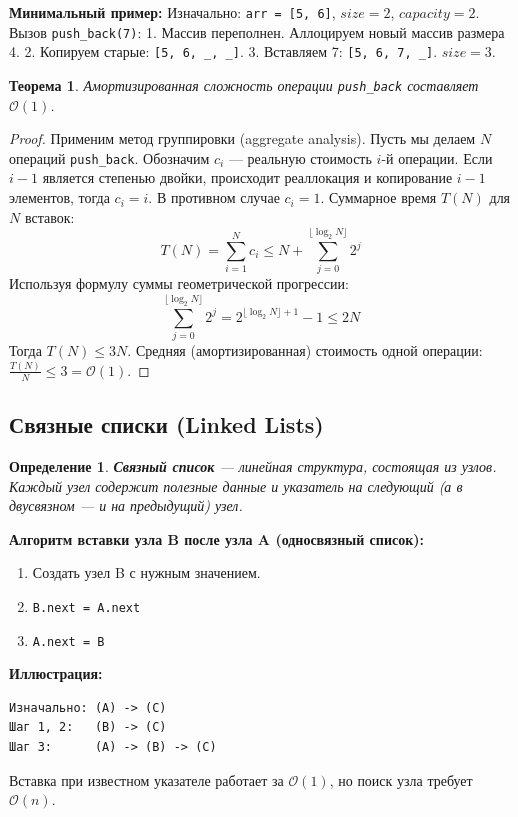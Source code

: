 \documentclass[12pt,a4paper]{article}
\newtheorem{definition}{Определение}
\newtheorem{theorem}{Теорема}
\begin{document}
\textbf{Минимальный пример:}
Изначально: \texttt{arr = [5, 6]}, $size = 2$, $capacity = 2$.
Вызов \texttt{push\_back(7)}:
1. Массив переполнен. Аллоцируем новый массив размера 4.
2. Копируем старые: \texttt{[5, 6, \_, \_]}.
3. Вставляем 7: \texttt{[5, 6, 7, \_]}. $size = 3$.

\begin{theorem}
Амортизированная сложность операции \texttt{push\_back} составляет $\mathcal{O}(1)$.
\end{theorem}
\begin{proof}
Применим метод группировки (aggregate analysis). Пусть мы делаем $N$ операций \texttt{push\_back}. Обозначим $c_i$ — реальную стоимость $i$-й операции.
Если $i-1$ является степенью двойки, происходит реаллокация и копирование $i-1$ элементов, тогда $c_i = i$. В противном случае $c_i = 1$.
Суммарное время $T(N)$ для $N$ вставок:
$$ T(N) = \sum_{i=1}^{N} c_i \le N + \sum_{j=0}^{\lfloor \log_2 N \rfloor} 2^j $$
Используя формулу суммы геометрической прогрессии:
$$ \sum_{j=0}^{\lfloor \log_2 N \rfloor} 2^j = 2^{\lfloor \log_2 N \rfloor + 1} - 1 \le 2N $$
Тогда $T(N) \le 3N$. Средняя (амортизированная) стоимость одной операции: $\frac{T(N)}{N} \le 3 = \mathcal{O}(1)$.
\end{proof}

\subsection{Связные списки (Linked Lists)}
\begin{definition}
\textbf{Связный список} — линейная структура, состоящая из узлов. Каждый узел содержит полезные данные и указатель на следующий (а в двусвязном — и на предыдущий) узел.
\end{definition}

\textbf{Алгоритм вставки узла B после узла A (односвязный список):}
\begin{enumerate}
    \item Создать узел B с нужным значением.
    \item \texttt{B.next = A.next}
    \item \texttt{A.next = B}
\end{enumerate}

\textbf{Иллюстрация:}
\begin{verbatim}
Изначально: (A) -> (C)
Шаг 1, 2:   (B) -> (C)
Шаг 3:      (A) -> (B) -> (C)
\end{verbatim}
Вставка при известном указателе работает за $\mathcal{O}(1)$, но поиск узла требует $\mathcal{O}(n)$.
\end{document}

